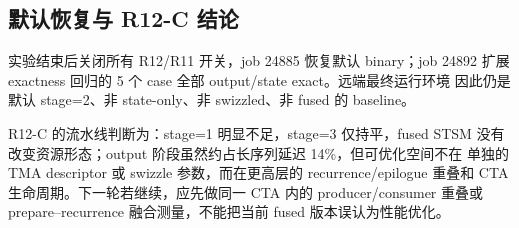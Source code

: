 \subsection{默认恢复与 R12-C 结论}

实验结束后关闭所有 R12/R11 开关，job 24885 恢复默认 binary；job 24892
扩展 exactness 回归的 5 个 case 全部 output/state exact。远端最终运行环境
因此仍是默认 stage=2、非 state-only、非 swizzled、非 fused 的 baseline。

R12-C 的流水线判断为：stage=1 明显不足，stage=3 仅持平，fused STSM
没有改变资源形态；output 阶段虽然约占长序列延迟 14\%，但可优化空间不在
单独的 TMA descriptor 或 swizzle 参数，而在更高层的 recurrence/epilogue
重叠和 CTA 生命周期。下一轮若继续，应先做同一 CTA 内的 producer/consumer
重叠或 prepare--recurrence 融合测量，不能把当前 fused 版本误认为性能优化。

